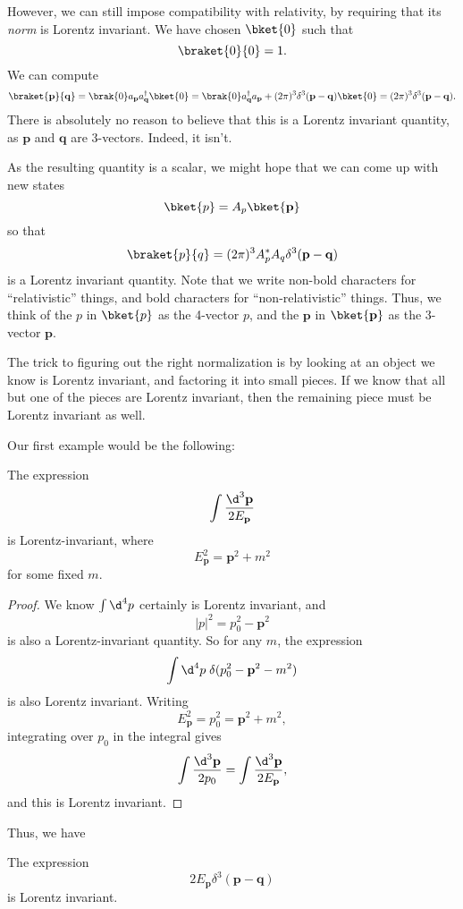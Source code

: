 \documentclass[a4paper]{article}
\begin{document}
However, we can still impose compatibility with relativity, by requiring that its \emph{norm} is Lorentz invariant. We have chosen $\bket{0}$ such that
\[
  \braket{0}{0} = 1.
\]
We can compute
\[
  \braket{\mathbf{p}}{\mathbf{q}} = \brak{0}a_\mathbf{p} a_\mathbf{q}^\dagger \bket{0} = \brak{0}a_\mathbf{q}^\dagger a_\mathbf{p} + (2\pi)^3 \delta^3(\mathbf{p} - \mathbf{q})\bket{0} = (2\pi)^3 \delta^3(\mathbf{p} - \mathbf{q}).
\]
There is absolutely no reason to believe that this is a Lorentz invariant quantity, as $\mathbf{p}$ and $\mathbf{q}$ are $3$-vectors. Indeed, it isn't.

As the resulting quantity is a scalar, we might hope that we can come up with new states
\[
  \bket{p} = A_p \bket{\mathbf{p}}
\]
so that
\[
  \braket{p}{q} = (2\pi)^3 A_p^* A_q \delta^3 (\mathbf{p} - \mathbf{q})
\]
is a Lorentz invariant quantity. Note that we write non-bold characters for ``relativistic'' things, and bold characters for ``non-relativistic'' things. Thus, we think of the $p$ in $\bket{p}$ as the 4-vector $p$, and the $\mathbf{p}$ in $\bket{\mathbf{p}}$ as the 3-vector $\mathbf{p}$.

The trick to figuring out the right normalization is by looking at an object we know is Lorentz invariant, and factoring it into small pieces. If we know that all but one of the pieces are Lorentz invariant, then the remaining piece must be Lorentz invariant as well.

Our first example would be the following:
\begin{prop}
  The expression
  \[
    \int \frac{\d^3 \mathbf{p}}{2 E_\mathbf{p}}
  \]
  is Lorentz-invariant, where
  \[
    E_\mathbf{p}^2 = \mathbf{p}^2 + m^2
  \]
  for some fixed $m$.
\end{prop}

\begin{proof}
  We know $\int \d^4 p$ certainly is Lorentz invariant, and
  \[
    |p|^2 = p_0^2 - \mathbf{p}^2
  \]
  is also a Lorentz-invariant quantity. So for any $m$, the expression
   \[
    \int \d^4 p\; \delta(p_0^2 - \mathbf{p}^2 - m^2)
  \]
  is also Lorentz invariant. Writing
  \[
    E_\mathbf{p}^2 = p_0^2 = \mathbf{p}^2 + m^2,
  \]
  integrating over $p_0$ in the integral gives
  \[
    \int \frac{\d^3 \mathbf{p}}{2p_0} =\int \frac{\d^3 \mathbf{p}}{2 E_\mathbf{p}},
  \]
  and this is Lorentz invariant.
\end{proof}

Thus, we have
\begin{prop}
  The expression
  \[
    2E_\mathbf{p} \delta^3 (\mathbf{p} - \mathbf{q})
  \]
  is Lorentz invariant.
\end{prop}
\end{document}
